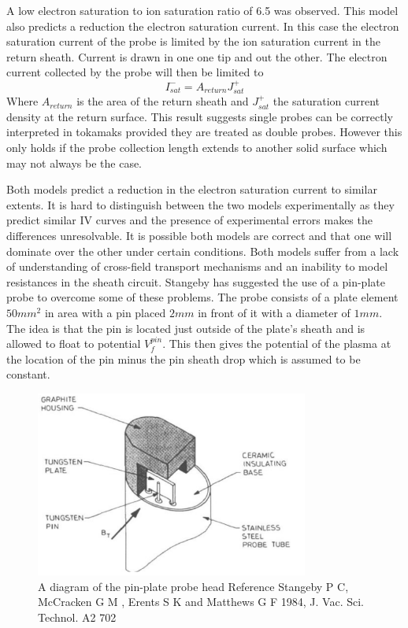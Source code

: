 \documentclass[12pt]{article}
\def\be{\begin{equation}}
\def\ee{\end{equation}}
\begin{document}
A low electron saturation to ion saturation ratio of 6.5 was observed.
This model also predicts a reduction the electron saturation current. In this case the electron saturation current of the probe is limited by the ion saturation current in the return sheath. Current is drawn in one one tip and out the other. The electron current collected by the probe will then be limited to 
\be 
I^-_{sat} = A_{return} J^+_{sat} 
\ee
Where $A_{return}$ is the area of the return sheath and  $J^+_{sat}$ the saturation current density at the return surface.
This result suggests single probes can be correctly interpreted in tokamaks provided they are treated as double probes. However this only holds if the probe collection length extends to another solid surface which may not always be the case.

Both models predict a reduction in the electron saturation current to similar extents. It is hard to distinguish between the two models experimentally as they predict similar IV curves and the presence of experimental errors makes the differences unresolvable. It is possible both models are correct and that one will dominate over the other under certain conditions. Both models suffer from a lack of understanding of cross-field transport mechanisms and an inability to model resistances in the sheath circuit. Stangeby has suggested the use of a pin-plate probe to overcome some of these problems. The probe consists of a plate element $50 mm^2$ in area with a pin placed $2mm$ in front of it with a diameter of $1mm$. The idea is that the pin is located just outside of the plate's sheath and is allowed to float to potential $V^{pin}_{f}$. This then gives the potential of the plasma at the location of the pin minus the pin sheath drop which is assumed to be constant.
\begin{figure}[H]
\centering
\includegraphics[width=0.8\textwidth]{pinprobe}
\caption{A diagram of the pin-plate probe head Reference Stangeby P C, McCracken G M , Erents S K and Matthews G F 1984, J. Vac. Sci. Technol. A2 702}
\end{figure}
\end{document}
